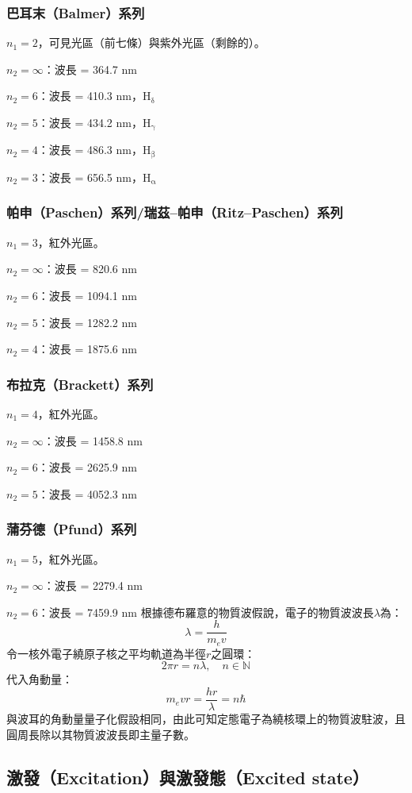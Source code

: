 \documentclass[a4paper,12pt]{report}
\begin{document}
\subsubsection{巴耳末（Balmer）系列}
$n_1 = 2$，可見光區（前七條）與紫外光區（剩餘的）。
\bit
\item $n_2=\infty$：波長 = 364.7 nm
\item $n_2=6$：波長 = 410.3 nm，H$_\text{δ}$
\item $n_2=5$：波長 = 434.2 nm，H$_\text{γ}$
\item $n_2=4$：波長 = 486.3 nm，H$_\text{β}$
\item $n_2=3$：波長 = 656.5 nm，H$_\text{α}$
\eit
\subsubsection{帕申（Paschen）系列/瑞茲–帕申（Ritz–Paschen）系列}
$n_1 = 3$，紅外光區。
\bit
\item $n_2=\infty$：波長 = 820.6 nm
\item $n_2=6$：波長 = 1094.1 nm
\item $n_2=5$：波長 = 1282.2 nm
\item $n_2=4$：波長 = 1875.6 nm
\eit
\subsubsection{布拉克（Brackett）系列}
$n_1 = 4$，紅外光區。
\bit
\item $n_2=\infty$：波長 = 1458.8 nm
\item $n_2=6$：波長 = 2625.9 nm
\item $n_2=5$：波長 = 4052.3 nm
\eit
\subsubsection{蒲芬德（Pfund）系列}
$n_1 = 5$，紅外光區。
\bit
\item $n_2=\infty$：波長 = 2279.4 nm
\item $n_2=6$：波長 = 7459.9 nm
\eit
{}
根據德布羅意的物質波假說，電子的物質波波長$\lambda$為：
\[\lambda=\frac{h}{m_ev}\]
令一核外電子繞原子核之平均軌道為半徑$r$之圓環：
\[2\pi r=n\lambda,\quad n\in\mathbb{N}\]
代入角動量：
\[m_evr=\frac{hr}{\lambda}=n\hbar\]
與波耳的角動量量子化假設相同，由此可知定態電子為繞核環上的物質波駐波，且圓周長除以其物質波波長即主量子數。
\subsection{激發（Excitation）與激發態（Excited state）}
\end{document}
